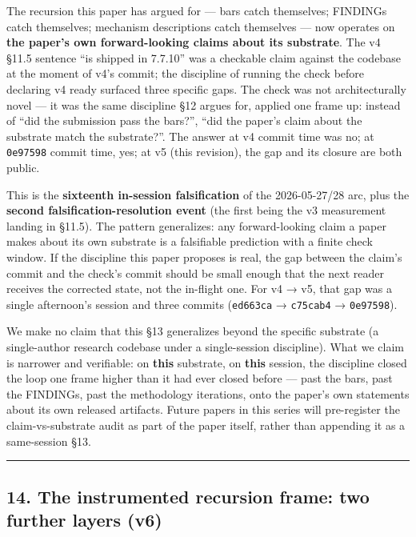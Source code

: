 \documentclass[
]{article}
\begin{document}
The recursion this paper has argued for --- bars catch themselves;
FINDINGs catch themselves; mechanism descriptions catch themselves ---
now operates on \textbf{the paper's own forward-looking claims about its
substrate}. The v4 §11.5 sentence ``is shipped in 7.7.10'' was a
checkable claim against the codebase at the moment of v4's commit; the
discipline of running the check before declaring v4 ready surfaced three
specific gaps. The check was not architecturally novel --- it was the
same discipline §12 argues for, applied one frame up: instead of ``did
the submission pass the bars?'', ``did the paper's claim about the
substrate match the substrate?''. The answer at v4 commit time was no;
at \texttt{0e97598} commit time, yes; at v5 (this revision), the gap and
its closure are both public.

This is the \textbf{sixteenth in-session falsification} of the
2026-05-27/28 arc, plus the \textbf{second falsification-resolution
event} (the first being the v3 measurement landing in §11.5). The
pattern generalizes: any forward-looking claim a paper makes about its
own substrate is a falsifiable prediction with a finite check window. If
the discipline this paper proposes is real, the gap between the claim's
commit and the check's commit should be small enough that the next
reader receives the corrected state, not the in-flight one. For v4 → v5,
that gap was a single afternoon's session and three commits
(\texttt{ed663ca} → \texttt{c75cab4} → \texttt{0e97598}).

We make no claim that this §13 generalizes beyond the specific substrate
(a single-author research codebase under a single-session discipline).
What we claim is narrower and verifiable: on \textbf{this} substrate, on
\textbf{this} session, the discipline closed the loop one frame higher
than it had ever closed before --- past the bars, past the FINDINGs,
past the methodology iterations, onto the paper's own statements about
its own released artifacts. Future papers in this series will
pre-register the claim-vs-substrate audit as part of the paper itself,
rather than appending it as a same-session §13.

\begin{center}\rule{0.5\linewidth}{0.5pt}\end{center}

\subsection{14. The instrumented recursion frame: two further layers
(v6)}\label{the-instrumented-recursion-frame-two-further-layers-v6}
\end{document}
